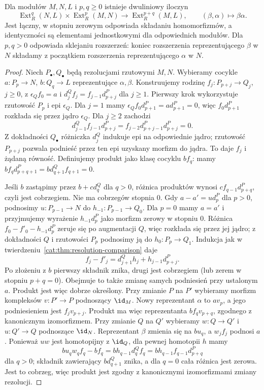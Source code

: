 \begin{twierdzenie}\label{cat:thm:yoneda-product}
Dla modułów $M,N,L$ i $p,q\ge0$ istnieje dwuliniowy iloczyn
\[
 \operatorname{Ext}_R^q(N,L)\times\operatorname{Ext}_R^p(M,N)
 \longrightarrow\operatorname{Ext}_R^{p+q}(M,L),
 \qquad(\beta,\alpha)\longmapsto\beta\alpha.
\]
Jest łączny, w stopniu zerowym odpowiada składaniu homomorfizmów, a identyczności są elementami jednostkowymi dla odpowiednich modułów. Dla $p,q>0$ odpowiada sklejaniu rozszerzeń: koniec rozszerzenia reprezentującego $\beta$ w $N$ składamy z początkiem rozszerzenia reprezentującego $\alpha$ w $N$.
\end{twierdzenie}
\begin{proof}
Niech $P_\bullet,Q_\bullet$ będą rezolucjami rzutowymi $M,N$. Wybieramy cocykle $a:P_p\to N$, $b:Q_q\to L$ reprezentujące $\alpha,\beta$. Konstruujemy rodzinę $f_j:P_{p+j}\to Q_j$, $j\ge0$, z
$\epsilon_Q f_0=a$ i $d_j^Q f_j=f_{j-1}d_{p+j}^P$ dla $j\ge1$. Pierwszy krok wykorzystuje rzutowość $P_p$ i epi $\epsilon_Q$. Dla $j=1$ mamy $\epsilon_Q f_0d_{p+1}^P=ad_{p+1}^P=0$, więc $f_0d_{p+1}^P$ rozkłada się przez jądro $\epsilon_Q$. Dla $j\ge2$ zachodzi
\[
 d_{j-1}^Q f_{j-1}d_{p+j}^P=f_{j-2}d_{p+j-1}^Pd_{p+j}^P=0.
\]
Z dokładności $Q_\bullet$ różniczka $d_j^Q$ indukuje epi na odpowiednie jądro; rzutowość $P_{p+j}$ pozwala podnieść przez ten epi uzyskany morfizm do jądra. To daje $f_j$ i żądaną równość. Definiujemy produkt jako klasę cocyklu $bf_q$: mamy $bf_qd_{p+q+1}^P=bd_{q+1}^Q f_{q+1}=0$.

Jeśli $b$ zastąpimy przez $b+c d_q^Q$ dla $q>0$, różnica produktów wynosi $c f_{q-1}d_{p+q}^P$, czyli jest cobrzegiem. Nie ma cobrzegów stopnia $0$. Gdy $a-a'=u d_p^P$ dla $p>0$, podnosimy $u:P_{p-1}\to N$ do $h_{-1}:P_{p-1}\to Q_0$. Dla $p=0$ mamy $a=a'$ i przyjmujemy wyrażenie $h_{-1}d_p^P$ jako morfizm zerowy w stopniu $0$. Różnica $f_0-f'_0-h_{-1}d_p^P$ zeruje się po augmentacji $Q$, więc rozkłada się przez jej jądro; z dokładności $Q$ i rzutowości $P_p$ podnosimy ją do $h_0:P_p\to Q_1$. Indukcja jak w twierdzeniu~\ref{cat:thm:resolution-comparison} daje
\[
 f_j-f'_j=d_{j+1}^Qh_j+h_{j-1}d_{p+j}^P.
\]
Po złożeniu z $b$ pierwszy składnik znika, drugi jest cobrzegiem (lub zerem w stopniu $p+q=0$). Obejmuje to także zmianę samych podniesień przy ustalonym $a$. Produkt jest więc dobrze określony. Przy zmianie $P$ na $P'$ wybieramy morfizm kompleksów $v:P'\to P$ podnoszący $\id_M$. Nowy reprezentant $\alpha$ to $av_p$, a jego podniesieniem jest $f_jv_{p+j}$. Produkt ma więc reprezentanta $bf_qv_{p+q}$, zgodnego z kanonicznym izomorfizmem. Przy zmianie $Q$ na $Q'$ wybieramy $w:Q\to Q'$ i $u:Q'\to Q$ podnoszące $\id_N$. Reprezentant $\beta$ zmienia się na $bu_q$, a $w_jf_j$ podnosi $a$. Ponieważ $uw$ jest homotopijny z $\id_Q$, dla pewnej homotopii $h$ mamy
\[
 bu_qw_qf_q-bf_q=b h_{q-1}d_q^Q f_q
 =b h_{q-1}f_{q-1}d_{p+q}^P
\]
dla $q>0$; składnik zawierający $bd_{q+1}^Q$ znika, a dla $q=0$ cała różnica jest zerowa. Jest to cobrzeg, więc produkt jest zgodny z kanonicznymi izomorfizmami zmiany rezolucji.


\end{proof}
